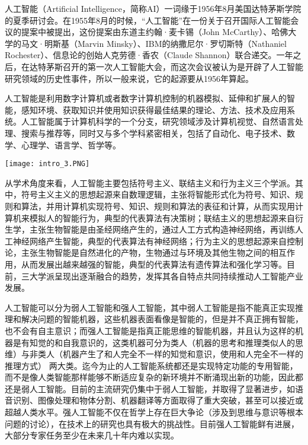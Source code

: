 人工智能（Artificial Intelligence，简称AI）一词缘于1956年8月美国达特茅斯学院的夏季研讨会。在1955年8月的时候，“人工智能”在一份关于召开国际人工智能会议的提案中被提出，这份提案由东道主约翰·麦卡锡（John McCarthy）、哈佛大学的马文·明斯基（Marvin Minsky）、IBM的纳撒尼尔·罗切斯特（Nathaniel Rochester）、信息论的创始人克劳德·香农（Claude Shannon）联合递交。一年之后，在达特茅斯召开的第一次人工智能大会，而这次会议被认为是开辟了人工智能研究领域的历史性事件，所以一般来说，它的起源要从1956年算起。


人工智能是利用数字计算机或者数字计算机控制的机器模拟、延伸和扩展人的智能，感知环境、获取知识并使用知识获得最佳结果的理论、方法、技术及应用系统。人工智能属于计算机科学的一个分支，研究领域涉及计算机视觉、自然语言处理、搜索与推荐等，同时又与多个学科紧密相关，包括了自动化、电子技术、数学、心理学、语言学、哲学等。

\begin{marginfigure}[-5.5cm]
	\texttt{[image: intro\_3.PNG]}
\end{marginfigure}

从学术角度来看，人工智能主要包括符号主义、联结主义和行为主义三个学派。其中，符号主义主义的思想起源来自数理逻辑，主张将智能形式化为符号、知识、规则和算法，并用计算机实现符号、知识、规则和算法的表征和计算，从而实现用计算机来模拟人的智能行为，典型的代表算法有决策树；联结主义的思想起源来自衍生学，主张生物智能是由圣经网络产生的，通过人工方式构造神经网络，再训练人工神经网络产生智能，典型的代表算法有神经网络；行为主义的思想起源来自控制论，主张生物智能是自然进化的产物，生物通过与环境及其他生物之间的相互作用，从而发展出越来越强的智能，典型的代表算法有遗传算法和强化学习等。目前，三大学派呈现出逐渐融合的趋势，发挥其各自特点共同持续推动人工智能产业发展。

人工智能可以分为弱人工智能和强人工智能，其中弱人工智能是指不能真正实现推理和解决问题的智能机器，这些机器表面看像是智能的，但是并不真正拥有智能，也不会有自主意识；而强人工智能是指真正能思维的智能机器，并且认为这样的机器是有知觉的和自我意识的，这类机器可分为类人（机器的思考和推理类似人的思维）与非类人（机器产生了和人完全不一样的知觉和意识，使用和人完全不一样的推理方式） 两大类。迄今为止的人工智能系统都还是实现特定功能的专用智能，而不是像人类智能那样能够不断适应复杂的新环境并不断涌现出新的功能，因此都还是弱人工智能。目前的主流研究仍集中于弱人工智能，并取得了显著进步，如语音识别、图像处理和物体分割、机器翻译等方面取得了重大突破，甚至可以接近或超越人类水平。强人工智能不仅在哲学上存在巨大争论（涉及到思维与意识等根本问题的讨论），在技术上的研究也具有极大的挑战性。目前强人工智能鲜有进展，大部分专家任务至少在未来几十年内难以实现。

